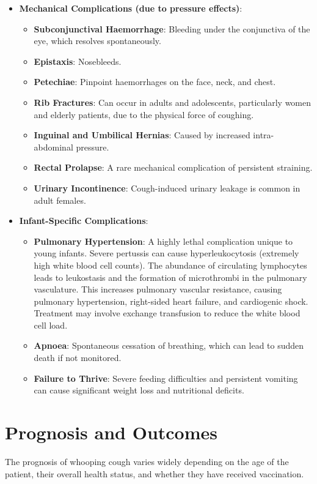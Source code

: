 \begin{itemize}
    \item \textbf{Mechanical Complications (due to pressure effects)}:
    \begin{itemize}
        \item \textbf{Subconjunctival Haemorrhage}: Bleeding under the conjunctiva of the eye, which resolves spontaneously.
        \item \textbf{Epistaxis}: Nosebleeds.
        \item \textbf{Petechiae}: Pinpoint haemorrhages on the face, neck, and chest.
        \item \textbf{Rib Fractures}: Can occur in adults and adolescents, particularly women and elderly patients, due to the physical force of coughing.
        \item \textbf{Inguinal and Umbilical Hernias}: Caused by increased intra-abdominal pressure.
        \item \textbf{Rectal Prolapse}: A rare mechanical complication of persistent straining.
        \item \textbf{Urinary Incontinence}: Cough-induced urinary leakage is common in adult females.
    \end{itemize}

    \item \textbf{Infant-Specific Complications}:
    \begin{itemize}
        \item \textbf{Pulmonary Hypertension}: A highly lethal complication unique to young infants. Severe pertussis can cause hyperleukocytosis (extremely high white blood cell counts). The abundance of circulating lymphocytes leads to leukostasis and the formation of microthrombi in the pulmonary vasculature. This increases pulmonary vascular resistance, causing pulmonary hypertension, right-sided heart failure, and cardiogenic shock. Treatment may involve exchange transfusion to reduce the white blood cell load.
        \item \textbf{Apnoea}: Spontaneous cessation of breathing, which can lead to sudden death if not monitored.
        \item \textbf{Failure to Thrive}: Severe feeding difficulties and persistent vomiting can cause significant weight loss and nutritional deficits.
    \end{itemize}
\end{itemize}

\section*{Prognosis and Outcomes}
The prognosis of whooping cough varies widely depending on the age of the patient, their overall health status, and whether they have received vaccination.

